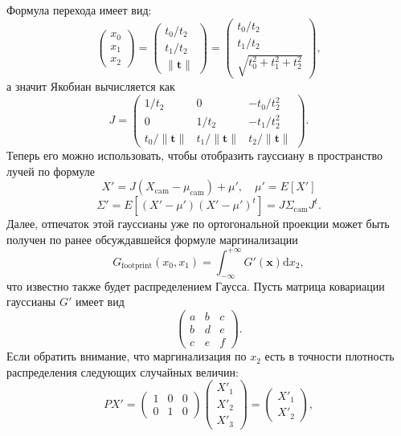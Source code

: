 Формула перехода имеет вид:
\[
	\begin{pmatrix} x_0 \\ x_1 \\ x_2 \end{pmatrix} =
	\begin{pmatrix}
		t_0 / t_2 \\
		t_1 / t_2 \\
		\| \mathbf t \|
	\end{pmatrix} =
	\begin{pmatrix}
		t_0 / t_2 \\
		t_1 / t_2 \\
		\sqrt{t_0^2 + t_1^2 + t_2^2}
	\end{pmatrix},
\]
%
а значит Якобиан вычисляется как
\[
	J = \begin{pmatrix}
		1 / t_2 & 0 & - t_0 / t_2^2 \\
		0 & 1 / t_2 & - t_1 / t_2^2 \\
		t_0 / \| \mathbf t \| & t_1 / \| \mathbf t \| & t_2 / \| \mathbf t \|
	\end{pmatrix}.
\]
%
Теперь его можно использовать, чтобы отобразить гауссиану в пространство лучей по формуле
%
\[
	X' = J(X_\text{cam} - \mu_\text{cam}) + \mu', \quad \mu' = E[X']
\]
\[
	\Sigma' = E \left[
		(X' - \mu') (X' - \mu')^t
	\right] = J \Sigma_\text{cam} J^t.
\]
%
Далее, отпечаток этой гауссианы уже по ортогональной проекции может быть получен по ранее обсуждавшейся формуле маргинализации
%
\[
	G_\text{footprint}(x_0, x_1) = \int_{-\infty}^{+\infty} G'(\mathbf x) \mathrm dx_2,
\]
%
что известно также будет распределением Гаусса. Пусть матрица ковариации гауссианы $G'$ имеет вид
%
\[
	\begin{pmatrix}
		a & b & c \\
		b & d & e \\
		c & e & f
	\end{pmatrix}.
\]
%
Если обратить внимание, что маргинализация по $x_2$ есть в точности плотность распределения следующих случайных величин:
%
\[
	PX' =
	\begin{pmatrix}
		1 & 0 & 0 \\
		0 & 1 & 0
	\end{pmatrix}
	\begin{pmatrix} X'_1 \\ X'_2 \\ X'_3\end{pmatrix} =
	\begin{pmatrix} X'_1 \\ X'_2 \end{pmatrix},
\]
